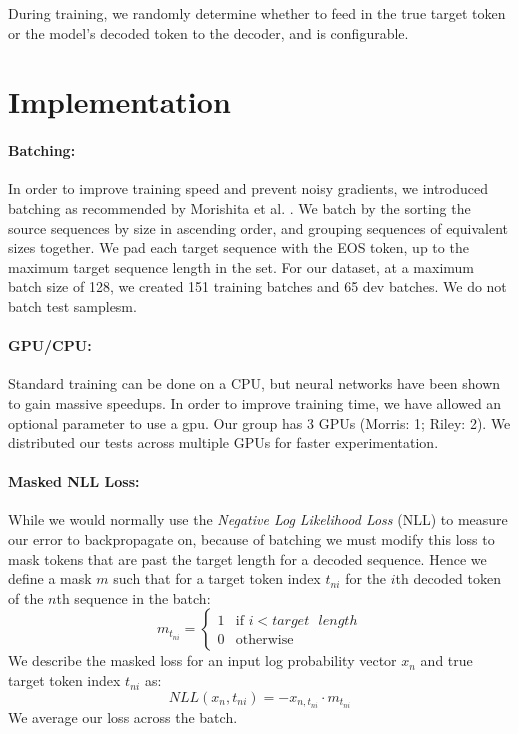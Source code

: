 \documentclass[twoside,twocolumn]{article}
\begin{document}
During training, we randomly determine whether to feed in the true target
token or the model's decoded token to the decoder, and is configurable.
\section{Implementation}
\label{sec:implementation}
\paragraph{Batching:}
In order to improve training speed and prevent noisy gradients, we introduced
batching as recommended by Morishita et al.
\cite{morishita2017empirical}. We batch by the sorting the source sequences by
size in ascending order, and grouping sequences of equivalent sizes together.
We pad each target sequence with
the EOS token, up to the maximum target sequence length in the set. For our
dataset, at a maximum batch size of 128, we created 151 training batches and
65 dev batches. We do not batch test samplesm.
\paragraph{GPU/CPU:}
Standard training can be done on a CPU, but neural networks have been shown to
gain massive speedups. In order to improve training time,
we have allowed an optional parameter to use a gpu.
Our group has 3 GPUs (Morris: 1; Riley: 2). We distributed our tests across
multiple GPUs for faster experimentation.
\paragraph{Masked NLL Loss:}
\label{sec:masked-loss}
While we would normally use the \emph{Negative Log Likelihood Loss} (NLL) to
measure our error to backpropagate on, because of batching we must modify this
loss to mask tokens that are past the target length for a decoded sequence.
Hence we define a mask $m$ such that for a target token index $t_{ni}$ for the
$i$th decoded token of the $n$th sequence in the batch:
\begin{equation}
  m_{t_{ni}} = \begin{cases}
    1 & \text{if } i < target \text{ } length \\
    0 & \text{otherwise}
  \end{cases}
\end{equation}
We describe the masked loss for an input log probability vector $x_n$ and true
target token index $t_{ni}$ as:
\begin{equation}
  NLL(x_n, t_{ni}) = -x_{n, t_{ni}} \cdot m_{t_{ni}}
\end{equation}
We average our loss across the batch.
\end{document}

